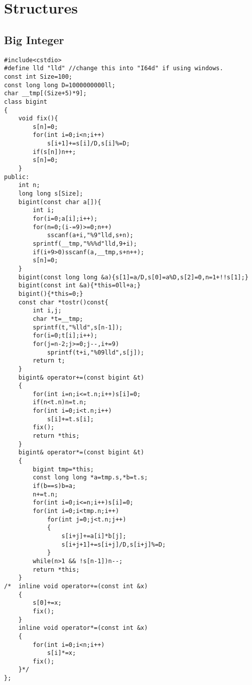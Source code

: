 \documentclass[9pt,a4paper,twocolumn,oneside]{article}
\begin{document}
\scriptsize
\section{Structures}
\subsection{Big Integer}
\begin{verbatim}
#include<cstdio>
#define lld "lld" //change this into "I64d" if using windows.
const int Size=100;
const long long D=1000000000ll;
char __tmp[(Size+5)*9];
class bigint
{
    void fix(){
        s[n]=0;
        for(int i=0;i<n;i++)
            s[i+1]+=s[i]/D,s[i]%=D;
        if(s[n])n++;
        s[n]=0;
    }
public:
    int n;
    long long s[Size];
    bigint(const char a[]){
        int i;
        for(i=0;a[i];i++);
        for(n=0;(i-=9)>=0;n++)
            sscanf(a+i,"%9"lld,s+n);
        sprintf(__tmp,"%%%d"lld,9+i);
        if(i+9>0)sscanf(a,__tmp,s+n++);
        s[n]=0;
    }
    bigint(const long long &a){s[1]=a/D,s[0]=a%D,s[2]=0,n=1+!!s[1];}
    bigint(const int &a){*this=0ll+a;}
    bigint(){*this=0;}
    const char *tostr()const{
        int i,j;
        char *t=__tmp;
        sprintf(t,"%lld",s[n-1]);
        for(i=0;t[i];i++);
        for(j=n-2;j>=0;j--,i+=9)
            sprintf(t+i,"%09lld",s[j]);
        return t;
    }
    bigint& operator+=(const bigint &t)
    {
        for(int i=n;i<=t.n;i++)s[i]=0;
        if(n<t.n)n=t.n;
        for(int i=0;i<t.n;i++)
            s[i]+=t.s[i];
        fix();
        return *this;
    }
    bigint& operator*=(const bigint &t)
    {
        bigint tmp=*this;
        const long long *a=tmp.s,*b=t.s;
        if(b==s)b=a;
        n+=t.n;
        for(int i=0;i<=n;i++)s[i]=0;
        for(int i=0;i<tmp.n;i++)
            for(int j=0;j<t.n;j++)
            {
                s[i+j]+=a[i]*b[j];
                s[i+j+1]+=s[i+j]/D,s[i+j]%=D;
            }
        while(n>1 && !s[n-1])n--;
        return *this;
    }
/*  inline void operator+=(const int &x)
    {
        s[0]+=x;
        fix();
    }
    inline void operator*=(const int &x)
    {
        for(int i=0;i<n;i++)
            s[i]*=x;
        fix();
    }*/
};
\end{verbatim}
\end{document}

